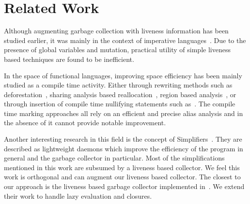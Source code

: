 \documentclass[9pt]{sigplanconf}
\begin{document}
\section{Related Work} 
\label{sec:relatedwork}
Although augmenting  garbage collection with liveness  information has
been  studied earlier,  it was  mainly  in the  context of  imperative
languages~\cite{Albert, Hirzel,  khedker07heap}.  Due to  the presence
of global variables and mutation, practical utility of simple liveness
based techniques are found to be inefficient.

In the space  of functional languages, improving  space efficiency has
been  mainly  studied  as  a compile  time  activity.  Either  through
rewriting                methods                such                as
deforestation~\cite{wadler88deforest,gill93ashort,chitil99deforest},
sharing  analysis   based  reallocation~\cite{jones89compile},  region
based  analysis~\cite{tofte98region}, or  through insertion  of compile
time              nullifying              statements              such
as~\cite{inoue88analysis,lee05static,Hamilton}.    The  compile   time
marking approaches all rely on an efficient and precise alias analysis
and in the absence of it cannot provide notable improvement.

Another  interesting  research  in  this   field  is  the  concept  of
Simplifiers~\cite{ONeill}. They are  described as lightweight daemons
which improve the efficiency of the program in general and the garbage
collector in particular. Most of the simplifications mentioned in this
work are subsumed by a liveness  based collector. We feel this work is
orthogonal and can augment our  liveness based collector.  The closest
to our  approach is the  liveness based garbage  collector implemented
in~\cite{asati14lgc}. We  extend their work to  handle lazy evaluation
and closures.
 

\end{document}
